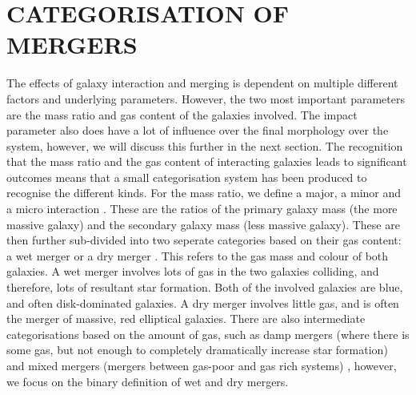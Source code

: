 \section{CATEGORISATION OF MERGERS}
\noindent The effects of galaxy interaction and merging is dependent on multiple different factors and underlying parameters. However, the two most important parameters are the mass ratio \citep{paper saying mass ratio is important} and gas content \citep{paper that says the gas content is important} of the galaxies involved. The impact parameter also does have a lot of influence over the final morphology over the system, however, we will discuss this further in the next section. The recognition that the mass ratio and the gas content of interacting galaxies leads to significant outcomes means that a small categorisation system has been produced to recognise the different kinds. For the mass ratio, we define a major, a minor and a micro interaction \citep{Paper with these definitions in them?}. These are the ratios of the primary galaxy mass (the more massive galaxy) and the secondary galaxy mass (less massive galaxy). These are then further sub-divided into two seperate categories based on their gas content: a wet merger or a dry merger \citep{Paper on wet vs dry mergers}. This refers to the gas mass and colour of both galaxies. A wet merger involves lots of gas in the two galaxies colliding, and therefore, lots of resultant star formation. Both of the involved galaxies are blue, and often disk-dominated galaxies. A dry merger involves little gas, and is often the merger of massive, red elliptical galaxies. There are also intermediate categorisations based on the amount of gas, such as damp mergers (where there is some gas, but not enough to completely dramatically increase star formation) and mixed mergers (mergers between gas-poor and gas rich systems) \citep{Paper on mixed / damp mergers}, however, we focus on the binary definition of wet and dry mergers.

